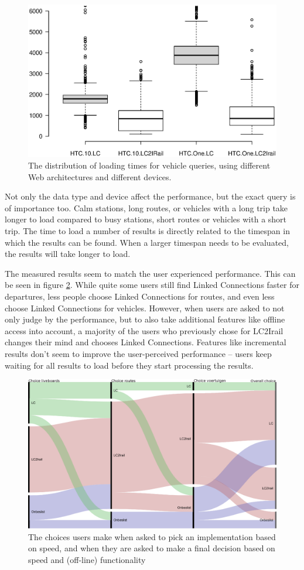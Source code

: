 \documentclass[twocolumn]{phdsymp} %
\begin{document}
\begin{figure}[ht]
	\begin{center}
		\includegraphics[trim=3cm 4cm 0 0, width=.50\textwidth]{images/boxplot_vehicles.eps}
		\caption{\label{fig:vehicle} The distribution of loading times for vehicle queries, using different Web architectures and different devices. }
	\end{center}
\end{figure}

Not only the data type and device affect the performance, but the exact query is of importance too. Calm stations, long routes, or vehicles with a long trip take longer to load compared to busy stations, short routes or vehicles with a short trip. The time to load a number of results is directly related to the timespan in which the results can be
found. When a larger timespan needs to be evaluated, the results will take longer to load.

The measured results seem to match the user experienced performance. This can be seen in figure \ref{fig:choices}. While quite some users still find Linked Connections faster for departures, less people choose Linked Connections for routes, and even less choose Linked Connections for vehicles. However, when users are asked to not only judge by the performance, but to also take additional features like offline access into account, a majority of the users who previously chose for LC2Irail changes their mind and chooses Linked Connections. Features like incremental results don’t seem to improve the user-perceived performance – users keep waiting for all results to load before they start processing the results.

\begin{figure}[ht]
	\begin{center}
		\includegraphics[width=.40\textwidth]{images/alluvial_user_choice_en.eps}
		\caption{\label{fig:choices} The choices users make when asked to pick an implementation based on speed, and when they are asked to make a final decision based on speed and (off-line) functionality }
	\end{center}
\end{figure}
\end{document}
